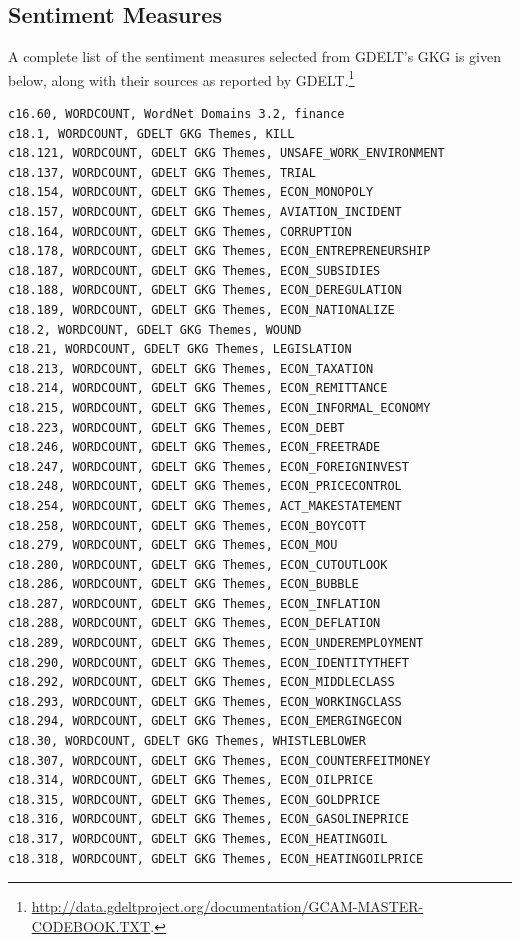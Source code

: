 \documentclass[12pt]{article}
\begin{document}
\subsection{Sentiment Measures}
A complete list of the sentiment measures selected from GDELT's GKG is given below, along with their sources as reported by GDELT.\footnote{\url{http://data.gdeltproject.org/documentation/GCAM-MASTER-CODEBOOK.TXT}.}

\footnotesize
\begin{verbatim}
c16.60, WORDCOUNT, WordNet Domains 3.2, finance
c18.1, WORDCOUNT, GDELT GKG Themes, KILL
c18.121, WORDCOUNT, GDELT GKG Themes, UNSAFE_WORK_ENVIRONMENT
c18.137, WORDCOUNT, GDELT GKG Themes, TRIAL
c18.154, WORDCOUNT, GDELT GKG Themes, ECON_MONOPOLY
c18.157, WORDCOUNT, GDELT GKG Themes, AVIATION_INCIDENT
c18.164, WORDCOUNT, GDELT GKG Themes, CORRUPTION
c18.178, WORDCOUNT, GDELT GKG Themes, ECON_ENTREPRENEURSHIP
c18.187, WORDCOUNT, GDELT GKG Themes, ECON_SUBSIDIES
c18.188, WORDCOUNT, GDELT GKG Themes, ECON_DEREGULATION
c18.189, WORDCOUNT, GDELT GKG Themes, ECON_NATIONALIZE
c18.2, WORDCOUNT, GDELT GKG Themes, WOUND
c18.21, WORDCOUNT, GDELT GKG Themes, LEGISLATION
c18.213, WORDCOUNT, GDELT GKG Themes, ECON_TAXATION
c18.214, WORDCOUNT, GDELT GKG Themes, ECON_REMITTANCE
c18.215, WORDCOUNT, GDELT GKG Themes, ECON_INFORMAL_ECONOMY
c18.223, WORDCOUNT, GDELT GKG Themes, ECON_DEBT
c18.246, WORDCOUNT, GDELT GKG Themes, ECON_FREETRADE
c18.247, WORDCOUNT, GDELT GKG Themes, ECON_FOREIGNINVEST
c18.248, WORDCOUNT, GDELT GKG Themes, ECON_PRICECONTROL
c18.254, WORDCOUNT, GDELT GKG Themes, ACT_MAKESTATEMENT
c18.258, WORDCOUNT, GDELT GKG Themes, ECON_BOYCOTT
c18.279, WORDCOUNT, GDELT GKG Themes, ECON_MOU
c18.280, WORDCOUNT, GDELT GKG Themes, ECON_CUTOUTLOOK
c18.286, WORDCOUNT, GDELT GKG Themes, ECON_BUBBLE
c18.287, WORDCOUNT, GDELT GKG Themes, ECON_INFLATION
c18.288, WORDCOUNT, GDELT GKG Themes, ECON_DEFLATION
c18.289, WORDCOUNT, GDELT GKG Themes, ECON_UNDEREMPLOYMENT
c18.290, WORDCOUNT, GDELT GKG Themes, ECON_IDENTITYTHEFT
c18.292, WORDCOUNT, GDELT GKG Themes, ECON_MIDDLECLASS
c18.293, WORDCOUNT, GDELT GKG Themes, ECON_WORKINGCLASS
c18.294, WORDCOUNT, GDELT GKG Themes, ECON_EMERGINGECON
c18.30, WORDCOUNT, GDELT GKG Themes, WHISTLEBLOWER
c18.307, WORDCOUNT, GDELT GKG Themes, ECON_COUNTERFEITMONEY
c18.314, WORDCOUNT, GDELT GKG Themes, ECON_OILPRICE
c18.315, WORDCOUNT, GDELT GKG Themes, ECON_GOLDPRICE
c18.316, WORDCOUNT, GDELT GKG Themes, ECON_GASOLINEPRICE
c18.317, WORDCOUNT, GDELT GKG Themes, ECON_HEATINGOIL
c18.318, WORDCOUNT, GDELT GKG Themes, ECON_HEATINGOILPRICE

\end{verbatim}
\end{document}
